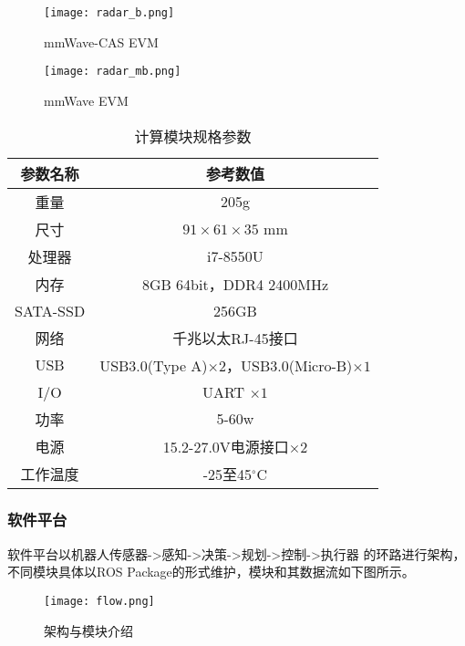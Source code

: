 \documentclass[lang=cn,11pt,a4paper]{elegantpaper}
\begin{document}
\begin{figure}
  \centering
  \texttt{[image: radar\_b.png]}
  \caption{mmWave-CAS EVM}\label{fig:CAS}
\end{figure}

\begin{figure}
  \centering
  \texttt{[image: radar\_mb.png]}
  \caption{mmWave EVM}\label{fig:mini}
\end{figure}
  

\begin{table}[!htbp]
  \centering
  \caption{计算模块规格参数}
  \begin{tabular}{cc}
    \toprule
    参数名称  & 参考数值  \\
    \midrule
    重量  & 205g   \\
    尺寸 & $91 \times 61 \times 35$ mm  \\
    处理器 &  i7-8550U \\
    内存 & 8GB 64bit，DDR4 2400MHz \\
    SATA-SSD & 256GB\\
    网络 & 千兆以太RJ-45接口\\
    USB & USB3.0(Type A)$\times 2$，USB3.0(Micro-B)$\times 1$ \\
    I/O & UART $\times 1$  \\
    功率 & 5-60w \\
    电源 & 15.2-27.0V电源接口$\times 2$  \\
    工作温度 & -25至45$^{\circ}$C\\
  \bottomrule
  \end{tabular}%
\end{table}%

\subsubsection{软件平台}

软件平台以机器人传感器->感知->决策->规划->控制->执行器 的环路进行架构，不同模块具体以ROS Package的形式维护，模块和其数据流如下图所示。
\begin{figure}
  \centering
  \texttt{[image: flow.png]}
  \caption{架构与模块介绍}\label{fig:flow}
\end{figure}
\end{document}
